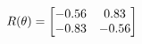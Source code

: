 \documentclass[preview]{standalone}
\begin{document}
\begin{align*}
\special{dvisvgm:raw <g id='unique000'>}R(\theta) = \begin{bmatrix}-0.56 & 0.83\\-0.83 & -0.56\end{bmatrix}\special{dvisvgm:raw </g>}
\end{align*}
\end{document}
